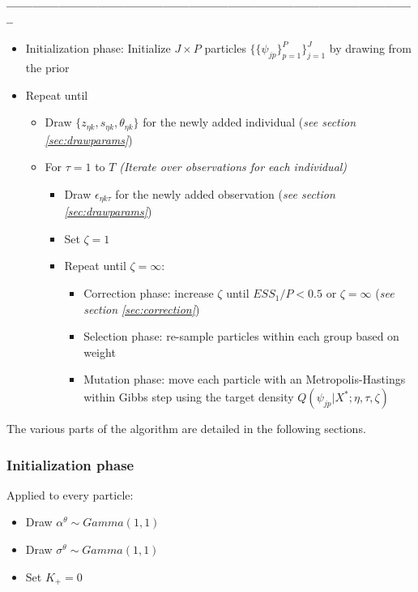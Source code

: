 \documentclass[12pt]{article}
\newcounter{thm}[section]
\begin{document}
\textbf{-----------------------------------------------------------------------------------------------}
\begin{itemize}
	\item Initialization phase: Initialize $J \times P$ particles $\{\{\psi_{jp}\}_{p=1}^P\}_{j=1}^J$ by drawing from the prior
	\item Repeat until 
	\begin{itemize}
		\item Draw $\{z_{\eta k},s_{\eta k},\theta_{\eta k}\}$ for the newly added individual (\textit{see section \ref{sec:drawparams}})
		\item For $\tau=1$ to $T$ {\it (Iterate over observations for each individual)}
		\begin{itemize}
			\item Draw $\epsilon_{\eta k \tau}$ for the newly added observation (\textit{see section \ref{sec:drawparams}})
			\item Set $\zeta = 1$
			\item Repeat until $\zeta = \infty$:
			\begin{itemize}
				\item Correction phase: increase $\zeta$ until $ESS_1/P<0.5$ or $\zeta=\infty$ (\textit{see section \ref{sec:correction}})
				\item Selection phase: re-sample particles within each group based on weight
				\item Mutation phase: move each particle with an Metropolis-Hastings within Gibbs step using the target density $ Q(\psi_{jp}|X^*;\eta,\tau,\zeta) $
			\end{itemize}
		\end{itemize}
	\end{itemize}
\end{itemize}

The various parts of the algorithm are detailed in the following sections.

\subsubsection{Initialization phase}

Applied to every particle:

\begin{itemize}
	\item Draw $\alpha^\theta \sim Gamma(1,1)$
	\item Draw $\sigma^\theta \sim Gamma(1,1)$
	\item Set $K_+ = 0$
\end{itemize}
\end{document}
